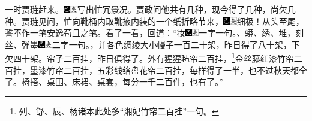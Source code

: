 一时贾琏赶来。{\includegraphics[width=3mm]{../Images/00003}\includegraphics[width=3mm]{../Images/00012}\footnotesize \kaishu 写出忙冗景况。}贾政问他共有几种，现今得了几种，尚欠几种。贾琏见问，忙向靴桶内取靴掖内装的一个纸折略节来，{\includegraphics[width=3mm]{../Images/00003}\includegraphics[width=3mm]{../Images/00012}\footnotesize \kaishu 细极！从头至尾，誓不作一笔安逸苟且之笔。}看了一看，回道：“妆{\includegraphics[width=3mm]{../Images/00003}\includegraphics[width=3mm]{../Images/00012}\footnotesize \kaishu 一字一句。}、蟒、绣、堆，刻丝、弹墨{\includegraphics[width=3mm]{../Images/00003}\includegraphics[width=3mm]{../Images/00012}\footnotesize \kaishu 二字一句。}，并各色绸绫大小幔子一百二十架，昨日得了八十架，下欠四十架。帘子二百挂，昨日俱得了。外有猩猩毡帘二百挂，\footnote{列、舒、辰、杨诸本此处多“湘妃竹帘二百挂”一句。}金丝藤红漆竹帘二百挂，墨漆竹帘二百挂，五彩线络盘花帘二百挂，每样得了一半，也不过秋天都全了。椅搭、桌围、床裙、桌套，每分一千二百件，也有了。”

